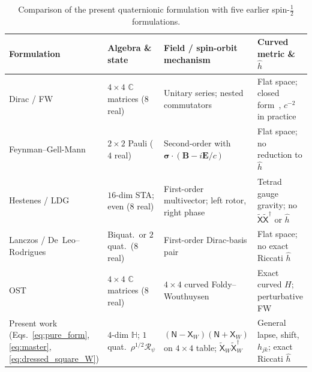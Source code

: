 \documentclass[aps,prd,onecolumn,tightenlines,nofootinbib,notitlepage,10pt,floatfix]{revtex4-2}
\theoremstyle{indentedtheorem}
\begin{document}
\begin{table}[htbp]
\centering
\footnotesize
\caption{Comparison of the present quaternionic formulation with five earlier spin-$\tfrac{1}{2}$ formulations.}
\label{tab:formulations}
\begin{tabular}{@{}p{3.4cm}p{3.1cm}p{4.6cm}p{4.0cm}@{}}
\toprule
\textbf{Formulation} & \textbf{Algebra \& state} & \textbf{Field / spin-orbit mechanism} & \textbf{Curved metric \& $\hat{h}$} \\
\midrule
Dirac / FW \citep{Dirac1928Quantum,Foldy1950Dirac,Eriksen1958Foldy} & $4\times 4$ $\mathbb{C}$ matrices ($8$ real) & Unitary series; nested commutators & Flat space; closed form~\citep{Eriksen1958Foldy}, $c^{-2}$ in practice \\
Feynman--Gell-Mann \citep{FeynmanGellMann1958Theory} & $2\times 2$ Pauli ($4$ real) & Second-order with $\boldsymbol{\sigma}\cdot(\mathbf{B}-i\mathbf{E}/c)$ & Flat space; no reduction to $\hat{h}$ \\
Hestenes / LDG \citep{Hestenes1967Real,LasenbyDoranGull1998Gravity} & $16$-dim STA; even ($8$ real) & First-order multivector; left rotor, right phase & Tetrad gauge gravity; no $\tilde{\mathsf{X}}\tilde{\mathsf{X}}^\dagger$ or $\hat{h}$ \\
Lanczos / De~Leo--Rodrigues \citep{Lanczos1929Tensoranalytischen,DeLeoRodrigues1998Quaternionic} & Biquat.\ or $2$ quat.\ ($8$ real) & First-order Dirac-basis pair & Flat space; no exact Riccati $\hat{h}$ \\
OST \citep{ObukhovSilenkoTeryaev2011Dirac} & $4\times 4$ $\mathbb{C}$ matrices ($8$ real) & $4\times 4$ curved Foldy--Wouthuysen & Exact curved $H$; perturbative FW \\
Present work (Eqs.~\eqref{eq:pure_form}, \eqref{eq:master}, \eqref{eq:dressed_square_W}) & $4$-dim $\mathbb{H}$; $1$ quat.\ $\rho^{1/2}\mathcal{R}_\psi$ & $(\mathsf{N}-\mathsf{X}_W)(\mathsf{N}+\mathsf{X}_W)$ on $4\times 4$ table; $\tilde{\mathsf{X}}_W\tilde{\mathsf{X}}_W^\dagger$ & General lapse, shift, $h_{jk}$; exact Riccati $\hat{h}$ \\
\bottomrule
\end{tabular}
\end{table}
\end{document}
